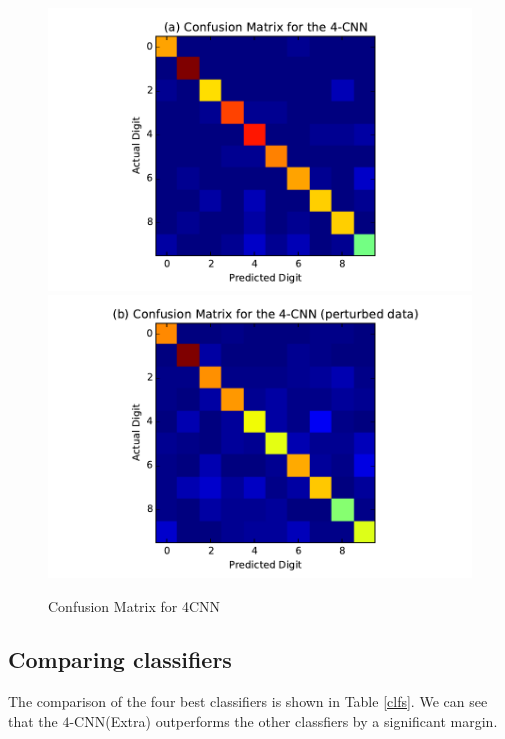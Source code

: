 \documentclass[conference]{IEEEtran}
\begin{document}
\begin{figure}[h]
	
	\centering
	\includegraphics[scale=0.5]{4CNN_confusion.pdf}
	\includegraphics[scale=0.5]{4CNN_perturbed_confusion.pdf}
	\caption{Confusion Matrix for 4CNN}
	\label{4CNN_confusion}
\end{figure}


\subsection{Comparing classifiers}

The comparison of the four best classifiers is shown in Table \ref{clfs}. We can see that the $4$-CNN(Extra) outperforms the other classfiers by a significant margin.
\end{document}
